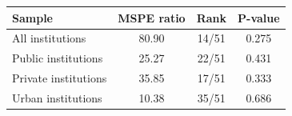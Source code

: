 \begin{tabular}{lccc}
\hline
Sample & MSPE ratio & Rank & P-value \\
\hline
All institutions & 80.90 & 14/51 & 0.275 \\
Public institutions & 25.27 & 22/51 & 0.431 \\
Private institutions & 35.85 & 17/51 & 0.333 \\
Urban institutions & 10.38 & 35/51 & 0.686 \\
\hline
\end{tabular}
